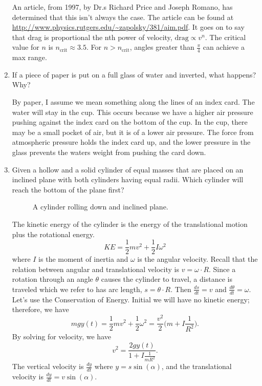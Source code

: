 \begin{enumerate}
  An article, from 1997, by Dr.s Richard Price and Joseph Romano, has determined
  that this isn't always the case.
  The article can be found at
  \url{http://www.physics.rutgers.edu/~zapolsky/381/aim.pdf}.
  It goes on to say that drag is proportional the nth power of velocity,
  \(\text{drag}\propto v^n\).
  The critical value for \(n\) is \(n_{\text{crit}}\approx 3.5\).
  For \(n > n_{\text{crit}}\), angles greater than \(\frac{\pi}{4}\) can
  achieve a max range.
\item
  If a piece of paper is put on a full glass of water and inverted, what
  happens?
  Why?
  \par\smallskip
  By paper, I assume we mean something along the lines of an index card.
  The water will stay in the cup.
  This occurs because we have a higher air pressure pushing against the index
  card on the bottom of the cup.
  In the cup, there may be a small pocket of air, but it is of a lower air
  pressure.
  The force from atmospheric pressure holds the index card up, and the lower
  pressure in the glass prevents the waters weight from pushing the card down.
\item
  Given a hollow and a solid cylinder of equal masses that are placed on an
  inclined plane with both cylinders having equal radii.
  Which cylinder will reach the bottom of the plane first?
  \begin{figure}[H]
    \centering
    
    \caption{A cylinder rolling down and inclined plane.}
  \end{figure}
  The kinetic energy of the cylinder is the energy of the translational motion
  plus the rotational energy.
  \[
  KE = \frac{1}{2}mv^2 + \frac{1}{2}I\omega^2
  \]
  where \(I\) is the moment of inertia and \(\omega\) is the angular velocity.
  Recall that the relation between angular and translational velocity is
  \(v = \omega\cdot R\).
  Since a rotation through an angle \(\theta\) causes the cylinder to travel,
  a distance is traveled which we refer to has arc length,
  \(s = \theta\cdot R\).
  Then \(\frac{ds}{dt} = v\) and \(\frac{d\theta}{dt} = \omega\).
  Let's use the Conservation of Energy.
  Initial we will have no kinetic energy; therefore, we have
  \[
  mgy(t) = \frac{1}{2}mv^2 + \frac{1}{2}\omega^2 =
  \frac{v^2}{2}\Big(m + I\frac{1}{R^2}\Big).
  \]
  By solving for velocity, we have
  \[
  v^2 = \frac{2gy(t)}{1 + I\frac{1}{mR^2}}.
  \]
  The vertical velocity is \(\frac{dy}{dt}\) where \(y = s\sin(\alpha)\), and
  the translational velocity is \(\frac{dy}{dt} = v\sin(\alpha)\).

\end{enumerate}

